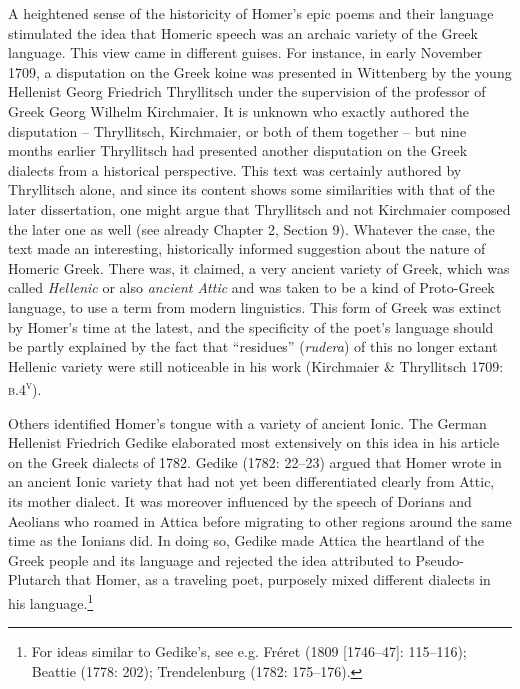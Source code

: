 \begin{styleStandard}
A heightened sense of the historicity of Homer’s epic poems and their language stimulated the idea that Homeric speech was an archaic variety of the Greek language. This view came in different guises. For instance, in early November 1709, a disputation on the Greek koine was presented in Wittenberg by the young Hellenist Georg Friedrich Thryllitsch under the supervision of the professor of Greek Georg Wilhelm Kirchmaier. It is unknown who exactly authored the disputation – Thryllitsch, Kirchmaier, or both of them together – but nine months earlier Thryllitsch had presented another disputation on the Greek dialects from a historical perspective. This text was certainly authored by Thryllitsch alone, and since its content shows some similarities with that of the later dissertation, one might argue that Thryllitsch and not Kirchmaier composed the later one as well (see already Chapter 2, Section 9). Whatever the case, the text made an interesting, historically informed suggestion about the nature of Homeric Greek. There was, it claimed, a very ancient variety of Greek, which was called \textit{Hellenic} or also \textit{ancient Attic} and was taken to be a kind of Proto-Greek language, to use a term from modern linguistics. This form of Greek was extinct by Homer’s time at the latest, and the specificity of the poet’s language should be partly explained by the fact that “residues” (\textit{rudera}) of this no longer extant Hellenic variety were still noticeable in his work (Kirchmaier \& Thryllitsch 1709: \textsc{b.4}\textsc{\textsuperscript{v}}).
\end{styleStandard}

\begin{styleStandard}
Others identified Homer’s tongue with a variety of ancient Ionic. The German Hellenist Friedrich Gedike elaborated most extensively on this idea in his article on the Greek dialects of 1782. Gedike (1782: 22–23) argued that Homer wrote in an ancient Ionic variety that had not yet been differentiated clearly from Attic, its mother dialect. It was moreover influenced by the speech of Dorians and Aeolians who roamed in Attica before migrating to other regions around the same time as the Ionians did. In doing so, Gedike made Attica the heartland of the Greek people and its language and rejected the idea attributed to Pseudo-Plutarch that Homer, as a traveling poet, purposely mixed different dialects in his language.\footnote{ For ideas similar to Gedike’s, see e.g. Fréret (1809 [1746–47]: 115–116); Beattie (1778: 202); Trendelenburg (1782: 175–176).}
\end{styleStandard}


